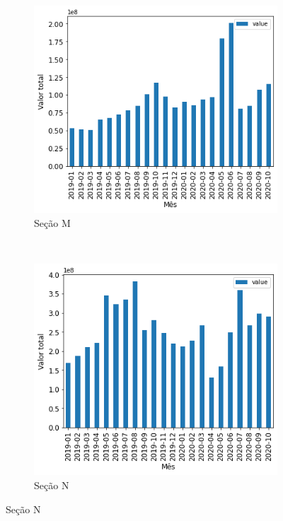 \begin{figure}[htb] 
    \centering 
    \caption{Valor mensal transacionado por seção no período analisado (Parte 3)}
    \label{fig:pandemia:descritiva-16.3-valor-mensal-por-secao} 
    \begin{subfigure}[b]{0.45\textwidth}
        \includegraphics[scale=0.45]{images/base-de-dados-16.M-valor-mensal-por-secao.png}
        \caption{Seção M}
        \label{fig:pandemia:descritiva-16.M-valor-mensal-por-secao}
    \end{subfigure} ~ \quad
    \begin{subfigure}[b]{0.45\textwidth}
        \includegraphics[scale=0.45]{images/base-de-dados-16.N-valor-mensal-por-secao.png}
        \caption{Seção N}
        \label{fig:pandemia:descritiva-16.N-valor-mensal-por-secao}

\end{subfigure}
\end{figure}
